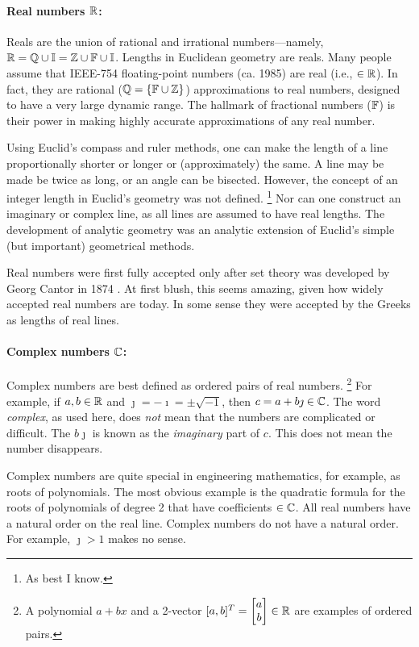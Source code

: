 \documentclass{ximera}
\begin{document}
\paragraph{Real numbers $\mathbb{R}$: \label{page:bbR} }
Reals are the union of rational and irrational numbers---namely, $\mathbb{R} = \mathbb{Q} \cup \mathbb{I}  = \mathbb{Z} \cup \mathbb{F} \cup \mathbb{I}$.
Lengths in Euclidean geometry are reals.  Many people assume that IEEE-754 floating-point numbers
(ca. 1985) are real (i.e., $\in\mathbb{R}$). In fact, they are rational ($\mathbb{Q} = \{\mathbb{F} \cup \mathbb{Z} \}$) approximations to
real numbers, designed to have a very large dynamic range.
The hallmark of fractional numbers ($\mathbb{F}$) is their power in making highly accurate approximations
of any real number.

Using Euclid's compass and ruler methods, one can make the length of a line proportionally shorter or longer or
(approximately) the same.  A line may be made be twice as long, or an angle can be bisected. However,
the concept of an integer length in Euclid's geometry was not defined.%
 \footnote{As best I know.}
Nor can one construct an imaginary or complex line, as all lines are assumed to have real lengths.
The development of analytic geometry was an analytic extension of Euclid's simple (but important)
geometrical methods.

  
Real numbers were first fully accepted only after set theory was developed by Georg Cantor in 1874
\citep[p.~461]{JS10}. At first blush, this seems amazing, given how widely accepted real numbers are
today.  In some sense they were accepted by the Greeks as lengths of real lines.

\paragraph{Complex numbers $\mathbb{C}$: \label{page:bbC} }
Complex numbers are best defined as ordered pairs of real numbers.%
 \footnote{A polynomial $a+bx$ and a 2-vector $[a,b]^T = \begin{bmatrix} a\\b \end{bmatrix} \in \mathbb{R}$ are examples of ordered pairs.}
For example, if $a,b \in \mathbb{R}$ and $\jmath=-\imath=\pm\sqrt{-1}$, then $c=a+b\jmath \in\mathbb{C}$.
The word \emph{complex}, as used here, does \emph{not} mean that the numbers are complicated or difficult. 
The $b\jmath$ is known as the \emph{imaginary} part of $c$. This does not mean the number disappears. 

Complex numbers are quite special in engineering mathematics, for example, as roots of polynomials.
The most obvious example is the quadratic formula for the roots of polynomials of degree 2 that have coefficients $\in\mathbb{C}$.
All real numbers have a natural order on the real line. Complex numbers do not have a natural order.
For example, $\jmath > 1$ makes no sense.
\end{document}
